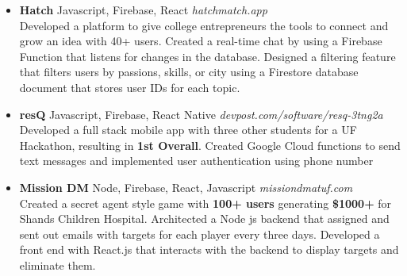 \documentclass[10pt]{article}
\newcommand{\project}[4]{ \vspace{1.5mm}
  \textbf{#1} #2 \hfill \textit{#3}#4 \vspace{1.5mm}
}
\begin{document}
	      \begin{itemize}[leftmargin=*]
	      	\item[]
	      	      \project
	      	      {Hatch}
	      	      {Javascript, Firebase, React}
	      	      {hatchmatch.app}
	      	      {\\Developed a platform to give college entrepreneurs the tools to connect and grow an idea with 40+ users. Created a real-time chat by using a Firebase Function that listens for changes in the database. Designed a filtering feature that filters users by passions, skills, or city using a Firestore database document that stores user IDs for each topic.}
	      	\item[]
	      	      \project
	      	      {resQ}
	      	      {Javascript, Firebase, React Native}
	      	      {devpost.com/software/resq-3tng2a}
	      	      {\\Developed a full stack mobile app with three other students for a UF Hackathon, resulting in \textbf{1st Overall}. Created Google Cloud functions to send text messages and implemented user authentication using phone number}
	      	\item[]
	      	      \project
	      	      {Mission DM}
	      	      {Node, Firebase, React, Javascript}
	      	      {missiondmatuf.com}
	      	      {\\Created a secret agent style game with \textbf{100+ users} generating \textbf{\$1000+} for Shands Children Hospital. Architected a Node js backend that assigned and sent out emails with targets for each player every three days. Developed a front end with React.js that interacts with the backend to display targets and eliminate them.}
	      \end{itemize}
	      
\end{document}
